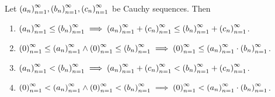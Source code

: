 \begin{theorem}\label{theorem:chapter1:cauchy-sequence-order-compatibility-with-addition-and-mulitplication}
    Let $\seq{a_{n}}, \seq{b_{n}}, \seq{c_{n}}$ be Cauchy sequences. Then
    \begin{enumerate}[label={(\roman*)}]
        \item ${\seq{a_{n}}\le\seq{b_{n}}} \implies {\seq{a_{n}}+\seq{c_{n}}\le\seq{b_{n}}+\seq{c_{n}}}$.
        \item ${\seq{0}\le\seq{a_{n}}} \land {\seq{0}\le\seq{b_{n}}} \implies {\seq{0}\le\seq{a_{n}}\cdot\seq{b_{n}}}$.
        \item ${\seq{a_{n}} < \seq{b_{n}}} \implies {\seq{a_{n}}+\seq{c_{n}} < \seq{b_{n}}+\seq{c_{n}}}$.
        \item ${\seq{0} < \seq{a_{n}}} \land {\seq{0} < \seq{b_{n}}} \implies {\seq{0} < \seq{a_{n}}\cdot\seq{b_{n}}}$.
    \end{enumerate}
\end{theorem}

